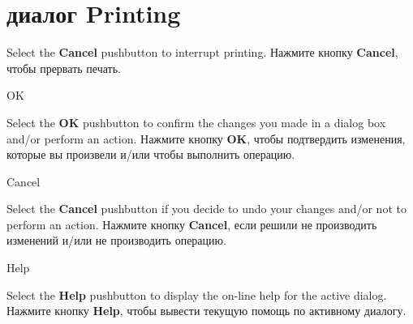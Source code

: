 \section{диалог Printing}
\fi
{}

\ifenglish
Select the {\bf Cancel} pushbutton to interrupt printing.
\else
Нажмите кнопку {\bf Cancel}, чтобы прервать печать.
\fi

\begin{popup}
\caption{OK}

\ifenglish
Select the {\bf OK} pushbutton to confirm the changes you made
in a dialog box and/or perform an action.
\else
Нажмите кнопку {\bf OK}, чтобы подтвердить изменения, которые вы произвели
и/или чтобы выполнить операцию.
\fi
\end{popup}

\begin{popup}
\caption{Cancel}

\ifenglish
Select the {\bf Cancel} pushbutton if you decide to undo
your changes and/or not to perform an action.
\else
Нажмите кнопку {\bf Cancel}, если решили не производить изменений и/или
не производить операцию.
\fi
\end{popup}

\begin{popup}
\caption{Help}

\ifenglish
Select the {\bf Help} pushbutton to display the on-line help for
the active dialog.
\else
Нажмите кнопку {\bf Help}, чтобы вывести текущую помощь по активному диалогу.
\fi
\end{popup}

